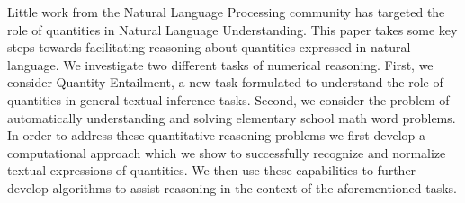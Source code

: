 Little work from the Natural Language Processing community has targeted the role of quantities in Natural Language Understanding. This paper takes some key steps towards facilitating reasoning about quantities expressed in natural language. We investigate two different tasks of numerical reasoning. First, we consider Quantity Entailment, a new task formulated to understand the role of quantities in general textual inference tasks. Second, we consider the problem of automatically understanding and solving elementary school math word problems. In order to address these quantitative reasoning problems we first develop a computational approach which we show to successfully recognize and normalize textual expressions of quantities. We then use these capabilities to further develop algorithms to assist reasoning in the context of the aforementioned tasks.
